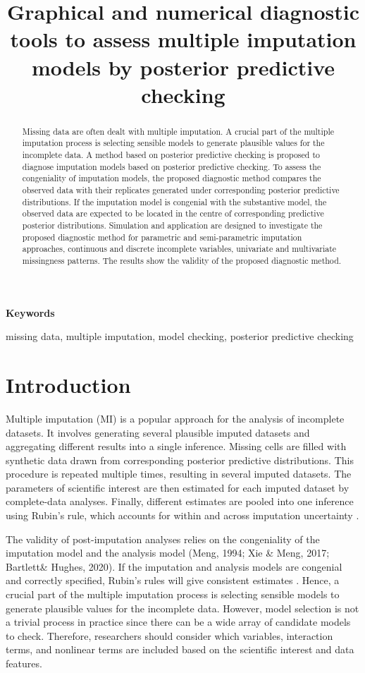 \documentclass[12pt, fullpage, a4paper]{article}
\begin{document}
\title{Graphical and numerical diagnostic tools to assess multiple imputation models by posterior predictive checking}
\author{}
\date{}
\maketitle
\begin{abstract}
Missing data are often dealt with multiple imputation. A crucial part of the multiple imputation process is selecting sensible models to generate plausible values for the incomplete data. A method based on posterior predictive checking is proposed to diagnose imputation models based on posterior predictive checking. To assess the congeniality of imputation models, the proposed diagnostic method compares the observed data with their replicates generated under corresponding posterior predictive distributions. If the imputation model is congenial with the substantive model, the observed data are expected to be located in the centre of corresponding predictive posterior distributions. Simulation and application are designed to investigate the proposed diagnostic method for parametric and semi-parametric imputation approaches, continuous and discrete incomplete variables, univariate and multivariate missingness patterns. The results show the validity of the proposed diagnostic method.  	
\end{abstract}

\textbf{Keywords}

missing data, multiple imputation, model checking, posterior predictive checking
\section{Introduction}
Multiple imputation (MI) is a popular approach for the analysis of incomplete datasets. It involves generating several plausible imputed datasets and aggregating different results into a single inference. Missing cells are filled with synthetic data drawn from corresponding posterior predictive distributions. This procedure is repeated multiple times, resulting in several imputed datasets. The parameters of scientific interest are then estimated for each imputed dataset by complete-data analyses. Finally, different estimates are pooled into one inference using Rubin's rule, which accounts for within and across imputation uncertainty \cite{RubinD1987}.  

The validity of post-imputation analyses relies on the congeniality of the imputation model and the analysis model (Meng, 1994\nocite{meng1994multiple}; Xie \& Meng, 2017\nocite{xie2017dissecting}; Bartlett\& Hughes, 2020\nocite{bartlett2020bootstrap}). If the imputation and analysis models are congenial and correctly specified, Rubin’s rules will give consistent estimates \cite{RubinD1987}. Hence, a crucial part of the multiple imputation process is selecting sensible models to generate plausible values for the incomplete data. However, model selection is not a trivial process in practice since there can be a wide array of candidate models to check. Therefore, researchers should consider which variables, interaction terms, and nonlinear terms are included based on the scientific interest and data features. 
\end{document}
